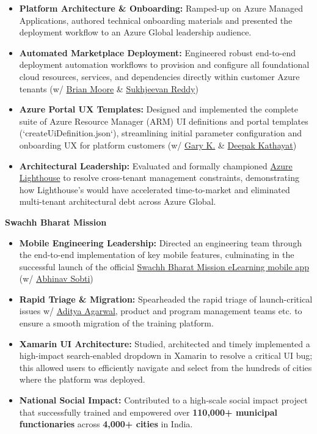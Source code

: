 \documentclass[a4paper,11pt]{article}
\begin{document}
  \begin{itemize}[label=\tiny$\circ$, leftmargin=1em, itemsep=1.0mm]
    \item \textbf{Platform Architecture \& Onboarding:} Ramped-up on Azure Managed Applications, authored technical onboarding materials and presented the deployment workflow to an Azure Global leadership audience.
    \item \textbf{Automated Marketplace Deployment:} Engineered robust end-to-end deployment automation workflows to provision and configure all foundational cloud resources, services, and dependencies directly within customer Azure tenants (w/ \href{https://www.linkedin.com/in/brianjmoore/}{Brian Moore} \& \href{https://www.linkedin.com/in/sukhjeevan-reddy-214883103/}{Sukhjeevan Reddy})
    \item \textbf{Azure Portal UX Templates:} Designed and implemented the complete suite of Azure Resource Manager (ARM) UI definitions and portal templates (`createUiDefinition.json`), streamlining initial parameter configuration and onboarding UX for platform customers (w/ \href{https://www.linkedin.com/in/gary-k-7577154/}{Gary K.} \& \href{https://www.linkedin.com/in/dmkxyz/}{Deepak Kathayat})
    \item \textbf{Architectural Leadership:} Evaluated and formally championed \href{https://learn.microsoft.com/en-us/azure/lighthouse/overview}{Azure Lighthouse} to resolve cross-tenant management constraints, demonstrating how Lighthouse’s would have accelerated time-to-market and eliminated multi-tenant architectural debt across Azure Global.
\vspace{1mm}
  \end{itemize}
\vspace{2mm}
\item \textbf{Swachh Bharat Mission}
  \begin{itemize}[label=\tiny$\circ$, leftmargin=1em, itemsep=1.0mm]
    \item \textbf{Mobile Engineering Leadership:} Directed an engineering team through the end-to-end implementation of key mobile features, culminating in the successful launch of the official \href{https://www.youtube.com/watch?v=IFN0Ux7T_qE}{Swachh Bharat Mission eLearning mobile app} (w/ \href{https://www.linkedin.com/in/abhinavsobti/}{Abhinav Sobti})
    \item \textbf{Rapid Triage \& Migration:} Spearheaded the rapid triage of launch-critical issues w/ \href{https://scholar.google.com/citations?user=64Cgbv4AAAAJ&hl=en&oi=ao}{Aditya Agarwal}, product and program management teams etc. to ensure a smooth migration of the training platform.
    \item \textbf{Xamarin UI Architecture:} Studied, architected and timely implemented a high-impact search-enabled dropdown in Xamarin to resolve a critical UI bug; this allowed users to efficiently navigate and select from the hundreds of cities where the platform was deployed.
    \item \textbf{National Social Impact:} Contributed to a high-scale social impact project that successfully trained and empowered over \textbf{110,000+ municipal functionaries} across \textbf{4,000+ cities} in India.
  \end{itemize}
\end{document}
